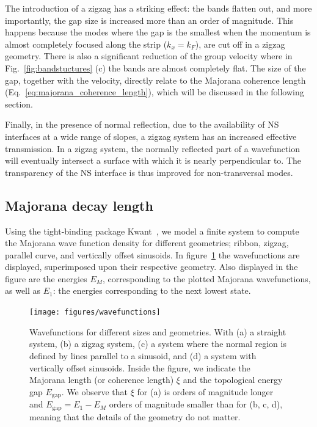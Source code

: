 			The introduction of a zigzag has a striking effect: the bands flatten out, and more importantly, the gap size is increased more than an order of magnitude.
			This happens because the modes where the gap is the smallest when the momentum is almost completely focused along the strip ($k_x=k_F$), are cut off in a zigzag geometry.
			There is also a significant reduction of the group velocity where in Fig.~\ref{fig:bandstuctures} (c) the bands are almost completely flat.
			The size of the gap, together with the velocity, directly relate to the Majorana coherence length (Eq.~\eqref{eq:majorana_coherence_length}), which will be discussed in the following section.

			Finally, in the presence of normal reflection, due to the availability of NS interfaces at a wide range of slopes, a zigzag system has an increased effective transmission.
			In a zigzag system, the normally reflected part of a wavefunction will eventually intersect a surface with which it is nearly perpendicular to.
			The transparency of the NS interface is thus improved for non-transversal modes.

		\subsection{Majorana decay length}

			Using the tight-binding package Kwant~\cite{groth_kwant:_2014}, we model a finite system to compute the Majorana wave function density for different geometries; ribbon, zigzag, parallel curve, and vertically offset sinusoids.
			In figure~\ref{fig:wavefunctions} the wavefunctions are displayed, superimposed upon their respective geometry.
			Also displayed in the figure are the energies $E_M$, corresponding to the plotted Majorana wavefunctions, as well as $E_1$: the energies corresponding to the next lowest state.

			\begin{figure}[!htb]
			\centering
			\texttt{[image: figures/wavefunctions]}
			\caption{Wavefunctions for different sizes and geometries.
			With (a) a straight system, (b) a zigzag system, (c) a system where the normal region is defined by lines parallel to a sinusoid, and (d) a system with vertically offset sinusoids.
			Inside the figure, we indicate the Majorana length (or coherence length) $\xi$ and the topological energy gap $E_\textrm{gap}$.
			We observe that $\xi$ for (a) is orders of magnitude longer and $E_\textrm{gap} = E_\textrm{1} - E_M$ orders of magnitude smaller than for (b, c, d), meaning that the details of the geometry do not matter.
			\label{fig:wavefunctions}}
			\end{figure}

